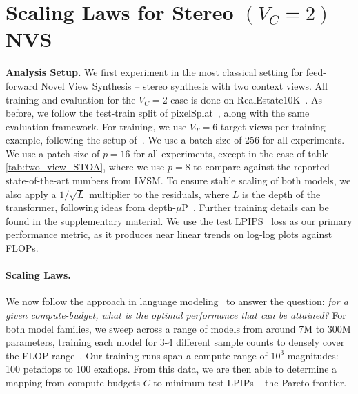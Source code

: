 


\section{Scaling Laws for Stereo \boldmath\texorpdfstring{$\left(V_C{=}2\right)$}{(Vc=2)} NVS}
\label{sec:scaling-two-view}

\textbf{Analysis Setup.}
%
We first experiment in the most classical setting for feed-forward Novel View Synthesis -- stereo synthesis with two context views. All training and evaluation for the $V_C = 2$ case is done on RealEstate10K~\cite{zhou2018stereo}. As before, we follow the test-train split of pixelSplat~\cite{charatan2024pixelsplat}, along with the same evaluation framework. For training, we use $V_T = 6$ target views per training example, following the setup of~\citep{jin2024lvsm}. We use a batch size of $256$ for all experiments. We use a patch size of $p = 16$ for all experiments, except in the case of table \ref{tab:two_view_STOA}, where we use $p = 8$ to compare against the reported state-of-the-art numbers from LVSM. To ensure stable scaling of both models, we also apply a $1/\sqrt{L}$ multiplier to the residuals, where $L$ is the depth of the transformer, following ideas from depth-$\mu$P~\citep{yang2023tensor,bordelon2023depthwise}. Further training details can be found in the supplementary material. We use the test LPIPS~\citep{zhang2018unreasonable} loss as our primary performance metric, as it produces near linear trends on log-log plots against FLOPs. %
\vspace{-1\baselineskip}



\label{subsec:scalinglaws}

\paragraph{Scaling Laws.}
We now follow the approach in language modeling~\cite{hoffmann2022training} to answer the question: \textit{for a given compute-budget, what is the optimal performance that can be attained?} For both model families, we sweep across a range of models from around 7M to 300M parameters, training each model for 3-4 different sample counts to densely cover the  FLOP range~\citep{hoffmann2022training}. Our training runs span a compute range of $10^3$ magnitudes: 100 petaflops to 100 exaflops. From this data, we are then able to determine a mapping from compute budgets $C$ to minimum test LPIPs -- the Pareto frontier. 

